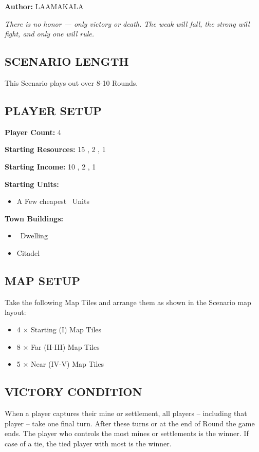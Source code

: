 
\begin{multicols*}{2}

\textbf{Author:} LAAMAKALA

\textit{There is no honor — only victory or death. The weak will fall, the strong will fight, and only one will rule.}

\subsection*{\MakeUppercase{Scenario Length}}
This Scenario plays out over 8-10 Rounds.

\subsection*{\MakeUppercase{Player Setup}}
\textbf{Player Count:} 4

\textbf{Starting Resources:} 15 , 2 , 1 

\textbf{Starting Income:} 10 , 2 , 1 

\textbf{Starting Units:}
\begin{itemize}
  \item A Few cheapest \silver\ Units
\end{itemize}

\textbf{Town Buildings:}
\begin{itemize}
  \item \bronze\ Dwelling
  \item Citadel
\end{itemize}

\subsection*{\MakeUppercase{Map Setup}}
Take the following Map Tiles and arrange them as shown in the Scenario map layout:

\begin{itemize}
  \item 4 × Starting (I) Map Tiles
  \item 8 × Far (II-III) Map Tiles
  \item 5 × Near (IV-V) Map Tiles
\end{itemize}

\subsection*{\MakeUppercase{Victory Condition}}
When a player captures their  mine or settlement, all players -- including that player -- take one final turn. After these turns or at the end of  Round the game ends. The player who controls the most mines or settlements is the winner. If case of a tie, the tied player with most  is the winner.


\end{multicols*}
